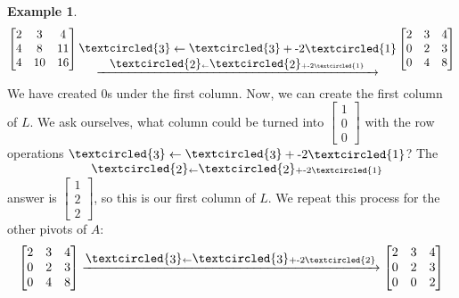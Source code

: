 \documentclass[a4paper,12pt]{article}
\theoremstyle{definition}
\theoremstyle{definition}
\newtheorem{example}{Example}[subsection]
\newcommand{\circlemath}[1]{\raisebox{0.5pt}{\textcircled{\raisebox{-.9pt} #1}}}
\newcommand{\replace}[3]{\circlemath{#1} \leftarrow \circlemath{#1} + \text{#3}\textcircled{#2}}
\newcommand{\replacerightarr}[3]{\xrightarrow{\replace{#1}{#2}{#3}}}
\begin{document}
	\begin{example}
		\label{ex:lu-factor-ex}
		\begin{equation*}
			\begin{bmatrix}
				2 & 3 & 4\\
				4 & 8 & 11\\
				4 & 10 & 16
			\end{bmatrix}
			\underset{\replacerightarr{2}{1}{-2}}{\replace{3}{1}{-2}}
			\begin{bmatrix}
				2 & 3 & 4\\
				0 & 2 & 3\\
				0 & 4 & 8
			\end{bmatrix}
		\end{equation*}
		We have created 0s under the first column. Now, we can create the first column of $L$. We ask ourselves, what column could be turned into $\begin{bmatrix}
			1\\
			0\\
			0
		\end{bmatrix}$
		with the row operations
		$\underset{\replace{2}{1}{-2}}{\replace{3}{1}{-2}}$? The answer is $\begin{bmatrix}
			1\\
			2\\
			2
		\end{bmatrix}$,
		so this is our first column of $L$. We repeat this process for the other pivots of $A$:
		\begin{equation*}
			\begin{bmatrix}
				2 & 3 & 4\\
				0 & 2 & 3\\
				0 & 4 & 8
			\end{bmatrix}
			\replacerightarr{3}{2}{-2}
			\begin{bmatrix}
				2 & 3 & 4\\
				0 & 2 & 3\\
				0 & 0 & 2
			\end{bmatrix}
		\end{equation*}
		

\end{example}
\end{document}
